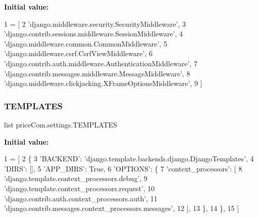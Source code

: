 {\bfseries Initial value\+:}
\begin{DoxyCode}
1 =  [
2     \textcolor{stringliteral}{'django.middleware.security.SecurityMiddleware'},
3     \textcolor{stringliteral}{'django.contrib.sessions.middleware.SessionMiddleware'},
4     \textcolor{stringliteral}{'django.middleware.common.CommonMiddleware'},
5     \textcolor{stringliteral}{'django.middleware.csrf.CsrfViewMiddleware'},
6     \textcolor{stringliteral}{'django.contrib.auth.middleware.AuthenticationMiddleware'},
7     \textcolor{stringliteral}{'django.contrib.messages.middleware.MessageMiddleware'},
8     \textcolor{stringliteral}{'django.middleware.clickjacking.XFrameOptionsMiddleware'},
9 ]
\end{DoxyCode}
\mbox{\label{namespacepriceCom_1_1settings_a112f8e851f99a0c38db520137d175da6}} 
\subsubsection{\texorpdfstring{T\+E\+M\+P\+L\+A\+T\+ES}{TEMPLATES}}
{\footnotesize\ttfamily list price\+Com.\+settings.\+T\+E\+M\+P\+L\+A\+T\+ES}

{\bfseries Initial value\+:}
\begin{DoxyCode}
1 =  [
2     \{
3         \textcolor{stringliteral}{'BACKEND'}: \textcolor{stringliteral}{'django.template.backends.django.DjangoTemplates'},
4         \textcolor{stringliteral}{'DIRS'}: [],
5         \textcolor{stringliteral}{'APP\_DIRS'}: \textcolor{keyword}{True},
6         \textcolor{stringliteral}{'OPTIONS'}: \{
7             \textcolor{stringliteral}{'context\_processors'}: [
8                 \textcolor{stringliteral}{'django.template.context\_processors.debug'},
9                 \textcolor{stringliteral}{'django.template.context\_processors.request'},
10                 \textcolor{stringliteral}{'django.contrib.auth.context\_processors.auth'},
11                 \textcolor{stringliteral}{'django.contrib.messages.context\_processors.messages'},
12             ],
13         \},
14     \},
15 ]
\end{DoxyCode}
